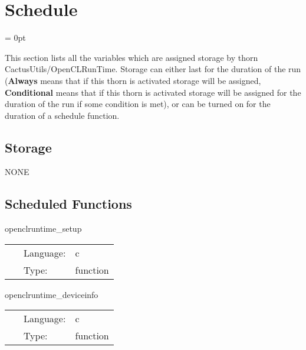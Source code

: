 
\section{Schedule} 


\parskip = 0pt


\noindent This section lists all the variables which are assigned storage by thorn CactusUtils/OpenCLRunTime.  Storage can either last for the duration of the run ({\bf Always} means that if this thorn is activated storage will be assigned, {\bf Conditional} means that if this thorn is activated storage will be assigned for the duration of the run if some condition is met), or can be turned on for the duration of a schedule function.


\subsection*{Storage}NONE
\subsection*{Scheduled Functions}
\vspace{5mm}


\hspace{5mm} openclruntime\_setup 

\hspace{5mm}{\it set up opencl device } 


\hspace{5mm}

 \begin{tabular*}{160mm}{cll} 
~ & Language:  & c \\ 
~ & Type:  & function \\ 
\end{tabular*} 


\vspace{5mm}


\hspace{5mm} openclruntime\_deviceinfo 

\hspace{5mm}{\it output opencl device information } 


\hspace{5mm}

 \begin{tabular*}{160mm}{cll} 
~ & Language:  & c \\ 
~ & Type:  & function \\ 
\end{tabular*} 


